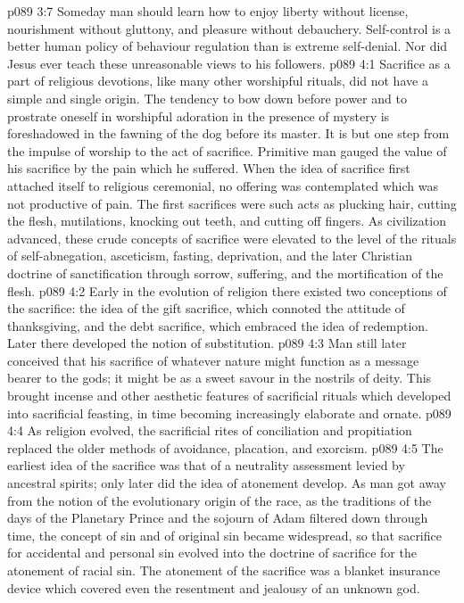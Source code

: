 \vs p089 3:7 \pc Someday man should learn how to enjoy liberty without license, nourishment without gluttony, and pleasure without debauchery. Self\hyp{}control is a better human policy of behaviour regulation than is extreme self\hyp{}denial. Nor did Jesus ever teach these unreasonable views to his followers.
\vs p089 4:1 Sacrifice as a part of religious devotions, like many other worshipful rituals, did not have a simple and single origin. The tendency to bow down before power and to prostrate oneself in worshipful adoration in the presence of mystery is foreshadowed in the fawning of the dog before its master. It is but one step from the impulse of worship to the act of sacrifice. Primitive man gauged the value of his sacrifice by the pain which he suffered. When the idea of sacrifice first attached itself to religious ceremonial, no offering was contemplated which was not productive of pain. The first sacrifices were such acts as plucking hair, cutting the flesh, mutilations, knocking out teeth, and cutting off fingers. As civilization advanced, these crude concepts of sacrifice were elevated to the level of the rituals of self\hyp{}abnegation, asceticism, fasting, deprivation, and the later Christian doctrine of sanctification through sorrow, suffering, and the mortification of the flesh.
\vs p089 4:2 Early in the evolution of religion there existed two conceptions of the sacrifice: the idea of the gift sacrifice, which connoted the attitude of thanksgiving, and the debt sacrifice, which embraced the idea of redemption. Later there developed the notion of substitution.
\vs p089 4:3 Man still later conceived that his sacrifice of whatever nature might function as a message bearer to the gods; it might be as a sweet savour in the nostrils of deity. This brought incense and other aesthetic features of sacrificial rituals which developed into sacrificial feasting, in time becoming increasingly elaborate and ornate.
\vs p089 4:4 \pc As religion evolved, the sacrificial rites of conciliation and propitiation replaced the older methods of avoidance, placation, and exorcism.
\vs p089 4:5 The earliest idea of the sacrifice was that of a neutrality assessment levied by ancestral spirits; only later did the idea of atonement develop. As man got away from the notion of the evolutionary origin of the race, as the traditions of the days of the Planetary Prince and the sojourn of Adam filtered down through time, the concept of sin and of original sin became widespread, so that sacrifice for accidental and personal sin evolved into the doctrine of sacrifice for the atonement of racial sin. The atonement of the sacrifice was a blanket insurance device which covered even the resentment and jealousy of an unknown god.
